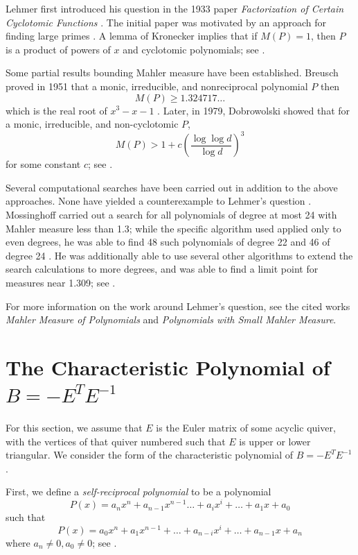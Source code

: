 \documentclass{amsart}
\theoremstyle{theorem}
\theoremstyle{theorem*}
\theoremstyle{definition}
\begin{document}
Lehmer first introduced his question in the 1933 paper \textit{Factorization of
    Certain Cyclotomic Functions} \cite{l}. The initial paper was motivated by
an approach for finding large primes \cite{ln}. A lemma of Kronecker implies
that if $M(P) = 1$, then $P$ is a product of powers of $x$ and cyclotomic
polynomials; see \cite{ln}.

Some partial results bounding Mahler measure have been established. Breusch
proved in 1951 that a monic, irreducible, and nonreciprocal polynomial $P$ then
$$M(P) \geq 1.324717\dots$$ which is the real root of $x^3 - x - 1$ \cite{ln}.
Later, in 1979, Dobrowolski showed that for a monic, irreducible, and
non-cyclotomic $P$,
$$M(P) > 1 + c \left(\frac{\log \log d}{\log d}\right)^3$$ for some constant $c$;
see \cite{ln}.

Several computational searches have been carried out in addition to the above
approaches. None have yielded a counterexample to Lehmer's question \cite{m}.
Mossinghoff carried out a search for all polynomials of degree at most 24 with
Mahler measure less than 1.3; while the specific algorithm used applied only to
even degrees, he was able to find 48 such polynomials of degree 22 and 46 of
degree 24 \cite{m}. He was additionally able to use several other algorithms to
extend the search calculations to more degrees, and was able to find a limit
point for measures near 1.309; see \cite{m}.

For more information on the work around Lehmer's question, see the cited works
\textit{Mahler Measure of Polynomials} and \textit{Polynomials with Small Mahler
    Measure}.

\section{The Characteristic Polynomial of $B = -E^T E^{-1}$}

For this section, we assume that $E$ is the Euler matrix of some acyclic quiver,
with the vertices of that quiver numbered such that $E$ is upper or lower
triangular. We consider
the form of the characteristic polynomial of $B = - E^T E^{-1}$.

First, we define a \textit{self-reciprocal polynomial} to be a polynomial
$$P(x) = a_n x^n + a_{n -1} x^{n - 1} \dots + a_i x^i + \dots + a_1 x + a_0$$
such that
$$P(x) = a_0 x^n + a_{1} x^{n - 1} + \dots + a_{n - i} x^{i}
+ \dots + a_{n - 1} x + a_n$$
where $a_n \neq 0, a_0 \neq 0$; see \cite{syz}.
\end{document}
